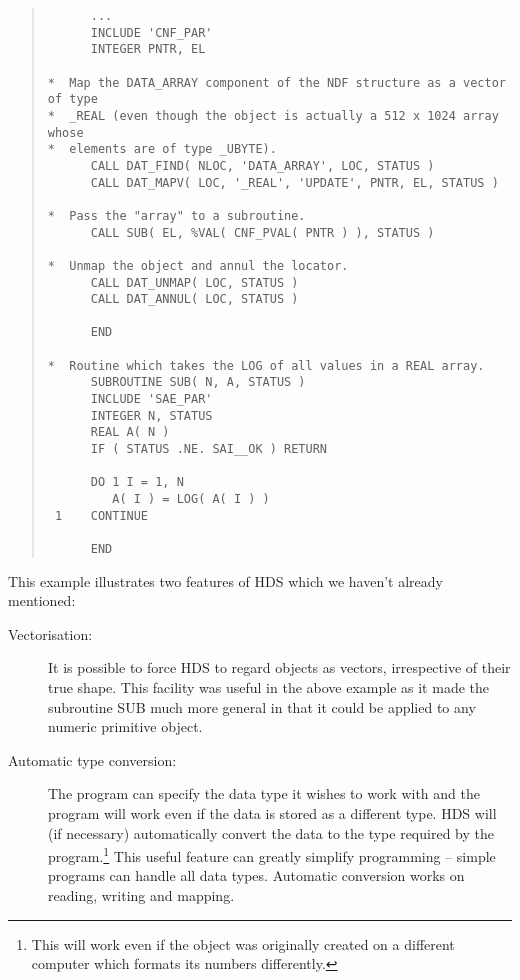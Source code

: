 \documentclass[11pt]{article}
\newcommand{\htmlref}[2]{#1}
\begin{document}
\small
\begin{quote}
\label{example:mapping}
\begin{verbatim}
      ...
      INCLUDE 'CNF_PAR'
      INTEGER PNTR, EL

*  Map the DATA_ARRAY component of the NDF structure as a vector of type
*  _REAL (even though the object is actually a 512 x 1024 array whose
*  elements are of type _UBYTE).
      CALL DAT_FIND( NLOC, 'DATA_ARRAY', LOC, STATUS )
      CALL DAT_MAPV( LOC, '_REAL', 'UPDATE', PNTR, EL, STATUS )

*  Pass the "array" to a subroutine.
      CALL SUB( EL, %VAL( CNF_PVAL( PNTR ) ), STATUS )

*  Unmap the object and annul the locator.
      CALL DAT_UNMAP( LOC, STATUS )
      CALL DAT_ANNUL( LOC, STATUS )

      END

*  Routine which takes the LOG of all values in a REAL array.
      SUBROUTINE SUB( N, A, STATUS )
      INCLUDE 'SAE_PAR'
      INTEGER N, STATUS
      REAL A( N )
      IF ( STATUS .NE. SAI__OK ) RETURN

      DO 1 I = 1, N
         A( I ) = LOG( A( I ) )
 1    CONTINUE

      END
\end{verbatim}
\end{quote}
\normalsize

This example illustrates two features of HDS which we haven't already
mentioned:

\begin{description}

\item [Vectorisation:]
It is possible to force HDS to regard objects as vectors, irrespective
of their true \htmlref{shape}{sect:shape}. This facility was useful in
the above example as it made the subroutine SUB much more general in
that it could be applied to any numeric primitive object.

\item [\label{sect:typeconversion}Automatic type conversion:]
The program can specify the data type it wishes to work with and the
program will work even if the data is stored as a different
\htmlref{type}{sect:type}. HDS will (if necessary) automatically
convert the data to the type required by the program.\footnote{This
will work even if the object was originally created on a different
computer which formats its numbers differently.} This useful feature
can greatly simplify programming -- simple programs can handle all
data types.  Automatic conversion works on reading, writing and
mapping.

\end{description}
\end{document}
